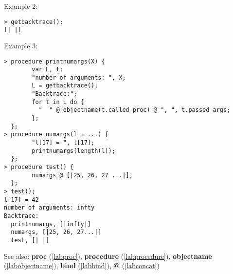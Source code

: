 \noindent Example 2: 
\begin{center}\begin{minipage}{15cm}\begin{Verbatim}[frame=single]
> getbacktrace();
[| |]
\end{Verbatim}
\end{minipage}\end{center}
\noindent Example 3: 
\begin{center}\begin{minipage}{15cm}\begin{Verbatim}[frame=single]
> procedure printnumargs(X) {
        var L, t;
        "number of arguments: ", X;
        L = getbacktrace();
        "Backtrace:";
        for t in L do {
          "  " @ objectname(t.called_proc) @ ", ", t.passed_args;
        };
  };
> procedure numargs(l = ...) {
        "l[17] = ", l[17];
        printnumargs(length(l));
  };
> procedure test() {
        numargs @ [|25, 26, 27 ...|];
  };
> test();
l[17] = 42
number of arguments: infty
Backtrace:
  printnumargs, [|infty|]
  numargs, [|25, 26, 27...|]
  test, [| |]
\end{Verbatim}
\end{minipage}\end{center}
See also: \textbf{proc} (\ref{labproc}), \textbf{procedure} (\ref{labprocedure}), \textbf{objectname} (\ref{labobjectname}), \textbf{bind} (\ref{labbind}), \textbf{@} (\ref{labconcat})
